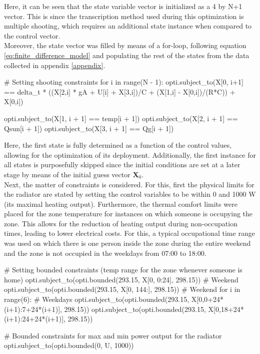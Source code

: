 Here, it can be seen that the state variable vector is initialized as a 4 by N+1 vector. This is since the transcription method used during this optimization is multiple shooting, which requires an additional state instance when compared to the control vector.\\

Moreover, the state vector was filled by means of a for-loop, following equation \ref{eq:finite_difference_model} and populating the rest of the states from the data collected in appendix \ref{appendix}.
\begin{python}
# Setting shooting constraints
for i in range(N - 1):
    opti.subject_to(X[0, i+1] == delta_t * ((X[2,i] * gA + U[i] + X[3,i])/C + (X[1,i] - X[0,i])/(R*C)) + 
    										 				X[0,i])
\end{python}    
\begin{python}
    opti.subject_to(X[1, i + 1] == temp[i + 1])
    opti.subject_to(X[2, i + 1] == Qsun[i + 1])
    opti.subject_to(X[3, i + 1] == Qg[i + 1])
\end{python}

Here, the first state is fully determined as a function of the control values, allowing for the optimization of its deployment. Additionally, the first instance for all states is purposefully skipped since the initial conditions are set at a later stage by means of the initial guess vector $\boldsymbol{X}_0$.\\

Next, the matter of constraints is considered. For this, first the physical limits for the radiator are stated by setting the control variables to be within 0 and 1000 W (its maximal heating output). Furthermore, the thermal comfort limits were placed for the zone temperature for instances on which someone is occupying the zone. This allows for the reduction of heating output during non-occupation times, leading to lower electrical costs. For this, a typical occupational time range was used on which there is one person inside the zone during the entire weekend and the zone is not occupied in the weekdays from 07:00 to 18:00.

\begin{python}
# Setting bounded constraints (temp range for the zone whenever someone is home)
opti.subject_to(opti.bounded(293.15, X[0, 0:24], 298.15))  # Weekend
opti.subject_to(opti.bounded(293.15, X[0, 144:], 298.15))  # Weekend
for i in range(6):  # Weekdays
   opti.subject_to(opti.bounded(293.15, X[0,0+24*(i+1):7+24*(i+1)], 298.15))
   opti.subject_to(opti.bounded(293.15, X[0,18+24*(i+1):24+24*(i+1)], 298.15))

# Bounded constraints for max and min power output for the radiator
opti.subject_to(opti.bounded(0, U, 1000))
\end{python}

